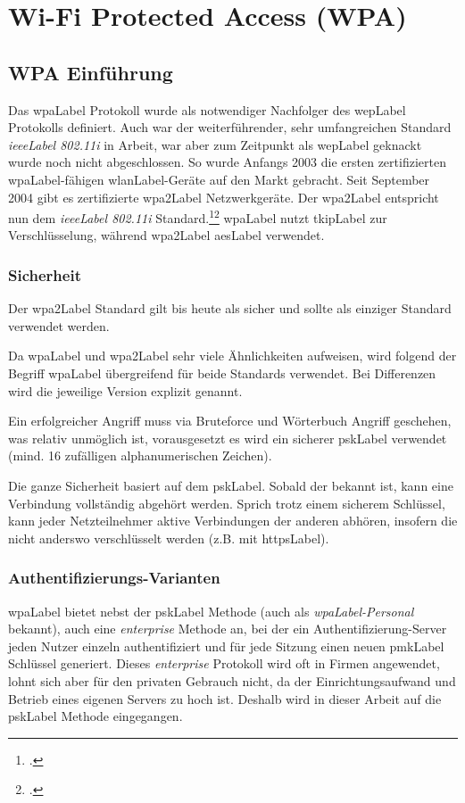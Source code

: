\chapter{Wi-Fi Protected Access (WPA)}
\label{ch:wpa}

\section{WPA Einführung}
Das \gls{wpaLabel} Protokoll wurde als notwendiger Nachfolger des \gls{wepLabel} Protokolls definiert.
Auch war der weiterführender, sehr umfangreichen Standard \textit{\gls{ieeeLabel} 802.11i} in Arbeit, war aber zum Zeitpunkt als \gls{wepLabel} geknackt wurde noch nicht abgeschlossen. So wurde Anfangs 2003 die ersten zertifizierten \gls{wpaLabel}-fähigen \gls{wlanLabel}-Geräte auf den Markt gebracht.
Seit September 2004 gibt es zertifizierte \gls{wpa2Label} Netzwerkgeräte. Der \gls{wpa2Label} entspricht nun dem \textit{\gls{ieeeLabel} 802.11i} Standard.\footcite{Wi-Fi_Protected_Access__Wikipedia_2015-04-10}\footcite{WPA2__Wikipedia_2015-04-10}
\gls{wpaLabel} nutzt \gls{tkipLabel} zur Verschlüsselung, während \gls{wpa2Label} \gls{aesLabel} verwendet.

\subsection{Sicherheit}
Der \gls{wpa2Label} Standard gilt bis heute als sicher und sollte als einziger Standard verwendet werden.

Da \gls{wpaLabel} und \gls{wpa2Label} sehr viele Ähnlichkeiten aufweisen, wird folgend der Begriff \gls{wpaLabel} übergreifend für beide Standards verwendet. Bei Differenzen wird die jeweilige Version explizit genannt.

Ein erfolgreicher Angriff muss via Bruteforce und Wörterbuch Angriff geschehen, was relativ unmöglich ist, vorausgesetzt es wird ein sicherer \gls{pskLabel} verwendet (mind. 16 zufälligen alphanumerischen Zeichen).

Die ganze Sicherheit basiert auf dem \gls{pskLabel}.
Sobald der bekannt ist, kann eine Verbindung vollständig abgehört werden.
Sprich trotz einem sicherem Schlüssel, kann jeder Netzteilnehmer aktive Verbindungen der anderen abhören, insofern die nicht anderswo verschlüsselt werden (z.B. mit \gls{httpsLabel}).


\subsection{Authentifizierungs-Varianten}
\gls{wpaLabel} bietet nebst der \gls{pskLabel} Methode (auch als \textit{\gls{wpaLabel}-Personal} bekannt), auch eine \textit{enterprise} Methode an, bei der ein Authentifizierung-Server jeden Nutzer einzeln authentifiziert und für jede Sitzung einen neuen \gls{pmkLabel} Schlüssel generiert.
Dieses \textit{enterprise} Protokoll wird oft in Firmen angewendet, lohnt sich aber für den privaten Gebrauch nicht, da der Einrichtungsaufwand und Betrieb eines eigenen Servers zu hoch ist.
Deshalb wird in dieser Arbeit auf die \gls{pskLabel} Methode eingegangen.


